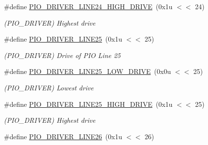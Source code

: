 \begin{DoxyCompactItemize}
\mbox{\label{group__SAME70__PIO_gadde0770b938ec63b897a19f0f7a59d42}} 
\#define \mbox{\hyperlink{group__SAME70__PIO_gadde0770b938ec63b897a19f0f7a59d42}{P\+I\+O\+\_\+\+D\+R\+I\+V\+E\+R\+\_\+\+L\+I\+N\+E24\+\_\+\+H\+I\+G\+H\+\_\+\+D\+R\+I\+VE}}~(0x1u $<$$<$ 24)
\begin{DoxyCompactList}\small\item\em (P\+I\+O\+\_\+\+D\+R\+I\+V\+ER) Highest drive \end{DoxyCompactList}\item 
\mbox{\label{group__SAME70__PIO_ga7f8742c78a8a36d9daea4dd1878f0b41}} 
\#define \mbox{\hyperlink{group__SAME70__PIO_ga7f8742c78a8a36d9daea4dd1878f0b41}{P\+I\+O\+\_\+\+D\+R\+I\+V\+E\+R\+\_\+\+L\+I\+N\+E25}}~(0x1u $<$$<$ 25)
\begin{DoxyCompactList}\small\item\em (P\+I\+O\+\_\+\+D\+R\+I\+V\+ER) Drive of P\+IO Line 25 \end{DoxyCompactList}\item 
\mbox{\label{group__SAME70__PIO_ga96a9aaf154c0cc69aeaa3984fa003905}} 
\#define \mbox{\hyperlink{group__SAME70__PIO_ga96a9aaf154c0cc69aeaa3984fa003905}{P\+I\+O\+\_\+\+D\+R\+I\+V\+E\+R\+\_\+\+L\+I\+N\+E25\+\_\+\+L\+O\+W\+\_\+\+D\+R\+I\+VE}}~(0x0u $<$$<$ 25)
\begin{DoxyCompactList}\small\item\em (P\+I\+O\+\_\+\+D\+R\+I\+V\+ER) Lowest drive \end{DoxyCompactList}\item 
\mbox{\label{group__SAME70__PIO_ga739e54f9d4c19e6e722202b6828a787f}} 
\#define \mbox{\hyperlink{group__SAME70__PIO_ga739e54f9d4c19e6e722202b6828a787f}{P\+I\+O\+\_\+\+D\+R\+I\+V\+E\+R\+\_\+\+L\+I\+N\+E25\+\_\+\+H\+I\+G\+H\+\_\+\+D\+R\+I\+VE}}~(0x1u $<$$<$ 25)
\begin{DoxyCompactList}\small\item\em (P\+I\+O\+\_\+\+D\+R\+I\+V\+ER) Highest drive \end{DoxyCompactList}\item 
\mbox{\label{group__SAME70__PIO_ga01ca9f2e050c3c12260122e506e02a9a}} 
\#define \mbox{\hyperlink{group__SAME70__PIO_ga01ca9f2e050c3c12260122e506e02a9a}{P\+I\+O\+\_\+\+D\+R\+I\+V\+E\+R\+\_\+\+L\+I\+N\+E26}}~(0x1u $<$$<$ 26)
$$
\end{DoxyCompactItemize}
